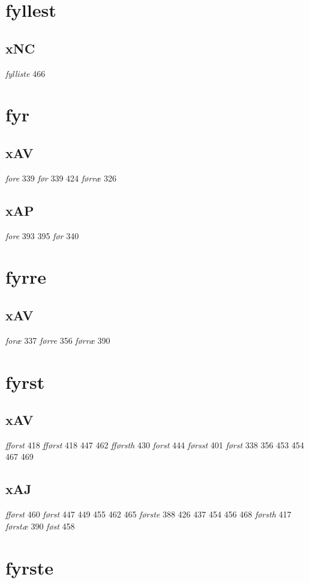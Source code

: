 \documentclass[a4paper,twocolumn]{article}
\begin{document}
\section{fyllest}
\label{sec:org73e4cc4}
\subsection{xNC}
\label{sec:org1572e3e}
\emph{fylliste} 466 
\section{fyr}
\label{sec:org0a04036}
\subsection{xAV}
\label{sec:orgba261c5}
\emph{fore} 339 \emph{før} 339 424 \emph{førræ} 326 
\subsection{xAP}
\label{sec:orgf1514c4}
\emph{fore} 393 395 \emph{før} 340 
\section{fyrre}
\label{sec:orgfe8a1d7}
\subsection{xAV}
\label{sec:org54c6cfb}
\emph{foræ} 337 \emph{førre} 356 \emph{førræ} 390 
\section{fyrst}
\label{sec:org3b434b8}
\subsection{xAV}
\label{sec:orgd791003}
\emph{fforst} 418 \emph{fførst} 418 447 462 \emph{fførsth} 430 \emph{forst} 444 \emph{førsst} 401 \emph{først} 338 356 453 454 467 469 
\subsection{xAJ}
\label{sec:org355b016}
\emph{fførst} 460 \emph{først} 447 449 455 462 465 \emph{første} 388 426 437 454 456 468 \emph{førsth} 417 \emph{førstæ} 390 \emph{føst} 458 
\section{fyrste}
\label{sec:org3bffc67}
\end{document}
